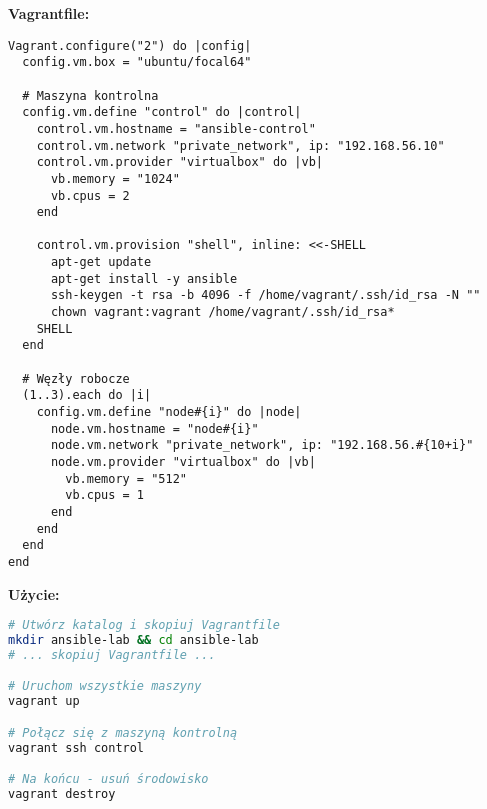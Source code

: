 \documentclass{article}
\begin{document}
\textbf{Vagrantfile:}
\begin{lstlisting}
Vagrant.configure("2") do |config|
  config.vm.box = "ubuntu/focal64"
  
  # Maszyna kontrolna
  config.vm.define "control" do |control|
    control.vm.hostname = "ansible-control"
    control.vm.network "private_network", ip: "192.168.56.10"
    control.vm.provider "virtualbox" do |vb|
      vb.memory = "1024"
      vb.cpus = 2
    end
    
    control.vm.provision "shell", inline: <<-SHELL
      apt-get update
      apt-get install -y ansible
      ssh-keygen -t rsa -b 4096 -f /home/vagrant/.ssh/id_rsa -N ""
      chown vagrant:vagrant /home/vagrant/.ssh/id_rsa*
    SHELL
  end
  
  # Węzły robocze
  (1..3).each do |i|
    config.vm.define "node#{i}" do |node|
      node.vm.hostname = "node#{i}"
      node.vm.network "private_network", ip: "192.168.56.#{10+i}"
      node.vm.provider "virtualbox" do |vb|
        vb.memory = "512"
        vb.cpus = 1
      end
    end
  end
end
\end{lstlisting}

\textbf{Użycie:}
\begin{lstlisting}[language=bash]
# Utwórz katalog i skopiuj Vagrantfile
mkdir ansible-lab && cd ansible-lab
# ... skopiuj Vagrantfile ...

# Uruchom wszystkie maszyny
vagrant up

# Połącz się z maszyną kontrolną
vagrant ssh control

# Na końcu - usuń środowisko
vagrant destroy
\end{lstlisting}
\end{document}
